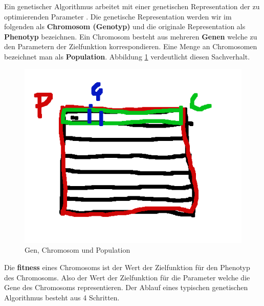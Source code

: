 Ein genetischer Algorithmus arbeitet mit einer genetischen Representation der zu optimierenden Parameter \cite*{TerminologiesAndOperators}. Die genetische Representation werden wir im folgenden als \textbf{Chromosom (Genotyp)}  und die originale Representation als \textbf{Phenotyp} bezeichnen. Ein Chromosom besteht aus mehreren \textbf{Genen} welche zu den Parametern der Zielfunktion korrespondieren. Eine Menge an Chromosomen bezeichnet man als \textbf{Population}. Abbildung \ref*{fig:population_chromosome_gene} verdeutlicht diesen Sachverhalt. 
\begin{figure}[h!]
    \includegraphics[scale=1.0]{images/Population_Chromosom_Gen.png}
    \caption{Gen, Chromosom und Population}
    \label{fig:population_chromosome_gene}
\end{figure}

Die \textbf{fitness} eines Chromosoms ist der Wert der Zielfunktion für den Phenotyp des Chromosoms. Also der Wert der Zielfunktion für die Parameter welche die Gene des Chromosoms representieren.
Der Ablauf eines typischen genetischen Algorithmus besteht aus 4 Schritten.

